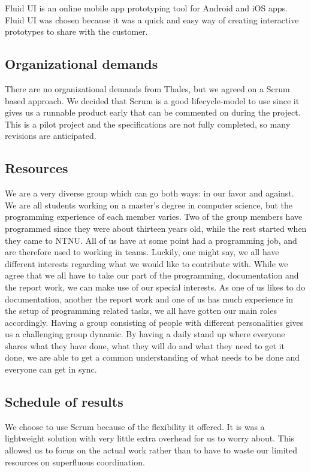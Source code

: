 Fluid UI \cite{bib:fui} is an online mobile app prototyping tool for Android and iOS apps. Fluid UI was chosen because it was a quick 
and easy way of creating interactive prototypes to share with the customer.

\subsection{Organizational demands}
There are no organizational demands from Thales, but we agreed on a Scrum based approach. We decided that Scrum is a good lifecycle-model to use since it gives us a runnable product early that can be commented on during the project. This is a pilot project and the specifications are not fully completed, so many revisions are anticipated.

\newpage

\subsection{Resources}
We are a very diverse group which can go both ways: in our favor and against. We are all students working on a master's degree in computer science, but the programming experience of each member varies. Two of the group members have
programmed since they were about thirteen years old, while the rest started when they came to NTNU. All of us have at some point had a programming job, and are therefore used to working in teams.
\newline
\newline
Luckily, one might say, we all have different interests regarding what we would like to contribute with. While we agree that we all have to take our part of the programming, documentation and the report work, we can make use of our special interests. As one of us likes to do documentation, another the report work and one of us has much experience in the setup of programming related tasks, we all have gotten our main roles accordingly.
\newline
\newline
Having a group consisting of people with different personalities gives us a challenging group dynamic. By having a daily stand up where everyone shares what they have done, what they will do and what they need to get it done, we are able to get a common understanding of what needs to be done and everyone can get in sync.

\subsection{Schedule of results}
We choose to use Scrum because of the flexibility it offered. It is was a lightweight solution with very little extra overhead for us to worry about. This allowed us to focus on the actual work rather than to have to waste our limited resources on superfluous coordination.
